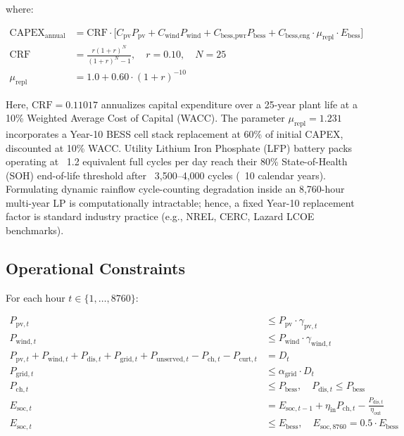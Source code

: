 \documentclass[11pt,a4paper]{article}
\begin{document}
where:

\begin{align}
\text{CAPEX}_{\text{annual}} &= \text{CRF} \cdot \Big[ C_{\text{pv}} P_{\text{pv}} + C_{\text{wind}} P_{\text{wind}} + C_{\text{bess,pwr}} P_{\text{bess}} + C_{\text{bess,eng}} \cdot \mu_{\text{repl}} \cdot E_{\text{bess}} \Big] \label{eq:capex} \\
\text{CRF} &= \frac{r(1+r)^N}{(1+r)^N - 1}, \quad r = 0.10, \quad N = 25 \label{eq:crf} \\
\mu_{\text{repl}} &= 1.0 + 0.60 \cdot (1 + r)^{-10} \label{eq:repl}
\end{align}

Here, $\text{CRF} = 0.11017$ annualizes capital expenditure over a 25-year plant life at a 10\% Weighted Average Cost of Capital (WACC). The parameter $\mu_{\text{repl}} = 1.231$ incorporates a Year-10 BESS cell stack replacement at 60\% of initial CAPEX, discounted at 10\% WACC. Utility Lithium Iron Phosphate (LFP) battery packs operating at ~1.2 equivalent full cycles per day reach their 80\% State-of-Health (SOH) end-of-life threshold after ~3,500--4,000 cycles (~10 calendar years). Formulating dynamic rainflow cycle-counting degradation inside an 8,760-hour multi-year LP is computationally intractable; hence, a fixed Year-10 replacement factor is standard industry practice (e.g., NREL, CERC, Lazard LCOE benchmarks).

\subsection{Operational Constraints}
\label{sec:constraints}

For each hour $t \in \{1, \dots, 8760\}$:

\begin{align}
P_{\text{pv},t} &\le P_{\text{pv}} \cdot \gamma_{\text{pv},t} \label{eq:solar_avail} \\
P_{\text{wind},t} &\le P_{\text{wind}} \cdot \gamma_{\text{wind},t} \label{eq:wind_avail} \\
P_{\text{pv},t} + P_{\text{wind},t} + P_{\text{dis},t} + P_{\text{grid},t} + P_{\text{unserved},t} - P_{\text{ch},t} - P_{\text{curt},t} &= D_t \label{eq:load_bal} \\
P_{\text{grid},t} &\le \alpha_{\text{grid}} \cdot D_t \label{eq:grid_limit} \\
P_{\text{ch},t} &\le P_{\text{bess}}, \quad P_{\text{dis},t} \le P_{\text{bess}} \label{eq:bess_pwr} \\
E_{\text{soc},t} &= E_{\text{soc},t-1} + \eta_{\text{in}} P_{\text{ch},t} - \frac{P_{\text{dis},t}}{\eta_{\text{out}}} \label{eq:soc_dyn} \\
E_{\text{soc},t} &\le E_{\text{bess}}, \quad E_{\text{soc},8760} = 0.5 \cdot E_{\text{bess}} \label{eq:soc_bound}
\end{align}
\end{document}
